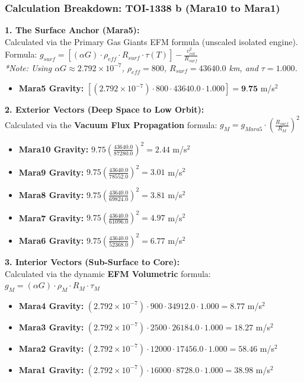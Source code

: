 \documentclass[11pt, a4paper]{article}
\begin{document}
\clearpage
\subsubsection{Calculation Breakdown: TOI-1338 b (Mara10 to Mara1)}

\noindent \textbf{1. The Surface Anchor (Mara5):} \\
Calculated via the Primary Gas Giants EFM formula (unscaled isolated engine). \\
Formula: $g_{surf} = \left[ (\alpha G) \cdot \rho_{eff} \cdot R_{surf} \cdot \tau(T) \right] - \frac{v_{rot}^2}{R_{surf}}$ \\
\textit{*Note: Using $\alpha G \approx 2.792 \times 10^{-7}$, $\rho_{eff} = 800$, $R_{surf} = 43640.0$ km, and $\tau = 1.000$.}
\begin{itemize}
  \item \textbf{Mara5 Gravity:} $\left[ (2.792 \times 10^{-7}) \cdot 800 \cdot 43640.0 \cdot 1.000 \right] = \textbf{9.75}$ m/s$^2$
\end{itemize}

\vspace{0.5em}
\noindent \textbf{2. Exterior Vectors (Deep Space to Low Orbit):} \\
Calculated via the \textbf{Vacuum Flux Propagation} formula: $g_M = g_{Mara5} \cdot \left( \frac{R_{surf}}{R_M} \right)^2$
\begin{itemize}
  \item \textbf{Mara10 Gravity:} $9.75 \left( \frac{43640.0}{87280.0} \right)^2 = 2.44$ m/s$^2$
  \item \textbf{Mara9 Gravity:} $9.75 \left( \frac{43640.0}{78552.0} \right)^2 = 3.01$ m/s$^2$
  \item \textbf{Mara8 Gravity:} $9.75 \left( \frac{43640.0}{69824.0} \right)^2 = 3.81$ m/s$^2$
  \item \textbf{Mara7 Gravity:} $9.75 \left( \frac{43640.0}{61096.0} \right)^2 = 4.97$ m/s$^2$
  \item \textbf{Mara6 Gravity:} $9.75 \left( \frac{43640.0}{52368.0} \right)^2 = 6.77$ m/s$^2$
\end{itemize}

\vspace{0.5em}
\noindent \textbf{3. Interior Vectors (Sub-Surface to Core):} \\
Calculated via the dynamic \textbf{EFM Volumetric} formula: $g_M = (\alpha G) \cdot \rho_{M} \cdot R_M \cdot \tau_M$
\begin{itemize}
  \item \textbf{Mara4 Gravity:} $(2.792 \times 10^{-7}) \cdot 900 \cdot 34912.0 \cdot 1.000 = 8.77$ m/s$^2$
  \item \textbf{Mara3 Gravity:} $(2.792 \times 10^{-7}) \cdot 2500 \cdot 26184.0 \cdot 1.000 = 18.27$ m/s$^2$
  \item \textbf{Mara2 Gravity:} $(2.792 \times 10^{-7}) \cdot 12000 \cdot 17456.0 \cdot 1.000 = 58.46$ m/s$^2$
  \item \textbf{Mara1 Gravity:} $(2.792 \times 10^{-7}) \cdot 16000 \cdot 8728.0 \cdot 1.000 = 38.98$ m/s$^2$
\end{itemize}
\end{document}
